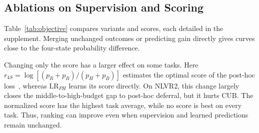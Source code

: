 \subsection{Ablations on Supervision and Scoring}
\label{sec:ablation}
\noindent\begin{minipage}{\columnwidth}

\end{minipage}\par\vspace{4pt}
Table~\ref{tab:objective} compares variants and scores, each detailed in the supplement. Merging unchanged outcomes or predicting gain directly gives curves close to the four-state probability difference.

Changing only the score has a larger effect on some tasks. Here $r_{4S}=\log[(p_R+p_B)/(p_H+p_B)]$ estimates the optimal score of the post-hoc loss~\cite{posthocdefer}, whereas $\mathrm{LR}_{PH}$ learns its score directly. On NLVR2, this change largely closes the middle-to-high-budget gap to post-hoc deferral, but it hurts CUB. The normalized score has the highest task average, while no score is best on every task. Thus, ranking can improve even when supervision and learned predictions remain unchanged.
